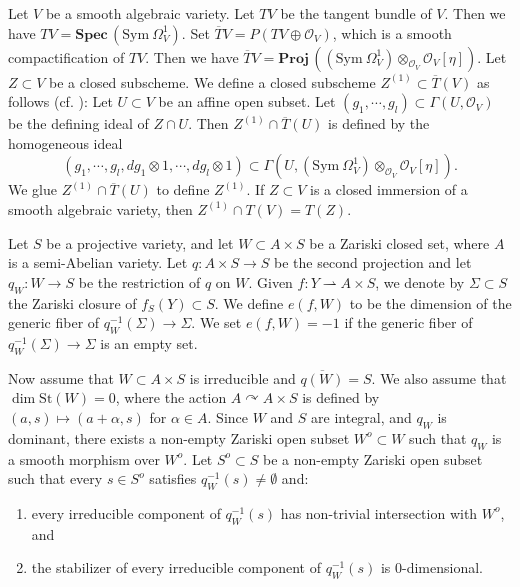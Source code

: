 \documentclass[11pt,english]{smfart}
\theoremstyle{plain}
\theoremstyle{definition}
\theoremstyle{remark}
\numberwithin{equation}{section}
\theoremstyle{plain}
\newcommand{\da}{\rightharpoonup}
\begin{document}
	Let $V$ be a smooth algebraic variety.
	Let $TV$ be the tangent bundle of $V$.
	Then we have $TV=\mathbf{Spec}\, (\mathrm{Sym}\ \Omega^1_V)$. 
	Set $\overline{T}V=P(TV\oplus \mathcal{O}_V)$, which is a smooth compactification of $TV$.
	Then we have $\overline{T}V=\mathbf{Proj}\, ((\mathrm{Sym}\ \Omega^1_V)\otimes_{\mathcal{O}_V}\mathcal O_V[\eta ])$.
	Let $Z\subset V$ be a closed subscheme.
	We define a closed subscheme $Z^{(1)}\subset \overline{T}(V)$ as follows (cf. \cite[p. 38]{Yam04}): 
	Let $U\subset V$ be an affine open subset.
	Let $(g_1,\cdots ,g_l)\subset \Gamma (U,\mathcal O_V)$ be the defining ideal of $Z\cap U$.
	Then $Z^{(1)}\cap \overline{T}(U)$ is defined by the homogeneous ideal
	$$(g_1,\cdots ,g_l,dg_1\otimes 1,\cdots ,dg_l\otimes 1)\subset \Gamma (U,(\mathrm{Sym}\ \Omega^1 _V)\otimes_{\mathcal O_V}\mathcal O_V[\eta ]).
	$$
	We glue $Z^{(1)}\cap \overline{T}(U)$ to define $Z^{(1)}$.
	If $Z\subset V$ is a closed immersion of a smooth algebraic variety, then $Z^{(1)}\cap T(V)=T(Z)$.
	
	
	
	
	
	
	Let $S$ be a projective variety, and let $W\subset A\times S$ be a Zariski closed set, where $A$ is a semi-Abelian variety.
	Let $q:A\times S\to S$ be the second projection and let $q_W:W\to S$ be the restriction of $q$ on $W$.
	Given $f:Y\da A\times S$, we denote by $\Sigma\subset S$ the Zariski closure of $f_S(Y)\subset S$.
	We define $e(f,W)$ to be the dimension of the generic fiber of $q_W^{-1}(\Sigma)\to \Sigma$.
	We set $e(f,W)=-1$ if the generic fiber of $q_W^{-1}(\Sigma)\to \Sigma$ is an empty set.
	
	
	
	Now assume that $W\subset A\times S$ is irreducible and $\overline{q(W)}=S$.
	We also assume that $\dim \mathrm{St}(W)=0$, where the action $A\curvearrowright A\times S$ is defined by $(a,s)\mapsto (a+\alpha,s)$ for $\alpha\in A$.
	Since $W$ and $S$ are integral, and $q_W$ is dominant, there exists a non-empty Zariski open subset $W^o\subset W$ such that $q_W$ is a smooth morphism over $W^o$.
	Let $S^o\subset S$ be a non-empty Zariski open subset such that every $s\in S^o$ satisfies $q_W^{-1}(s)\not=\emptyset$ and:
	\begin{enumerate}[label=(\arabic*)]
	\item
	every irreducible component of $q_W^{-1}(s)$ has non-trivial intersection with $W^o$, and 
	\item
	the stabilizer of every irreducible component of $q_W^{-1}(s)$ is 0-dimensional.
	\end{enumerate}
	
\end{document}
